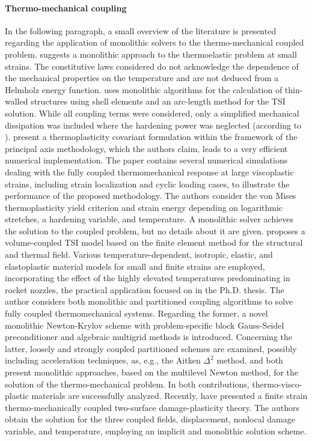 \paragraph{Thermo-mechanical coupling}

In the following paragraph, a small overview of the literature is presented regarding the application of monolithic solvers to the thermo-mechanical coupled problem.
\cite{carter_finite_1989} suggests a monolithic approach to the thermoelastic problem at small strains.
The constitutive laws considered do not acknowledge the dependence of the mechanical properties on the temperature and are not deduced from a Helmholz energy function.
\cite{glaser_gekoppelte_1992} uses monolithic algorithms for the calculation of thin-walled structures using shell elements and an arc-length method for the TSI solution.
While all coupling terms were considered, only a simplified mechanical dissipation was included where the hardening power was neglected (according to \cite{danowski_computational_2014}).
\cite{ibrahimbegovic_covariant_2002} present a thermoplasticity covariant formulation within the framework of the principal axis methodology, which the authors claim, leads to a very efficient numerical implementation.
The paper contains several numerical simulations dealing with the fully coupled thermomechanical response at large viscoplastic strains, including strain localization and cyclic loading cases, to illustrate the performance of the proposed methodology.
The authors consider the von Mises thermoplasticity yield criterion and strain energy depending on logarithmic stretches, a hardening variable, and temperature.
A monolithic solver achieves the solution to the coupled problem, but no details about it are given.
\cite{danowski_computational_2014} proposes a volume-coupled TSI model based on the finite element method for the structural and thermal field.
Various temperature-dependent, isotropic, elastic, and elastoplastic material models for small and finite strains are employed, incorporating the effect of the highly elevated temperatures predominating in rocket nozzles, the practical application focused on in the Ph.D. thesis.
The author considers both monolithic and partitioned coupling algorithms to solve fully coupled thermomechanical systems.
Regarding the former,  a novel monolithic Newton-Krylov scheme with problem-specific block Gauss-Seidel preconditioner and algebraic multigrid methods is introduced.
Concerning the latter, loosely and strongly coupled partitioned schemes are examined, possibly including acceleration techniques, as, e.g., the Aitken \(\Delta^2\) method.
\cite{netz_high-order_2013} and \cite{rothe_monolithic_2015} both present monolithic approaches, based on the multilevel Newton method, for the solution of the thermo-mechanical problem.
In both contributions, thermo-visco-plastic materials are successfully analyzed.
Recently, \cite{felder_thermo-mechanically_2021} have presented a finite strain thermo-mechanically coupled two-surface damage-plasticity theory.
The authors obtain the solution for the three coupled fields, displacement, nonlocal damage variable, and temperature, employing an implicit and monolithic solution scheme.

